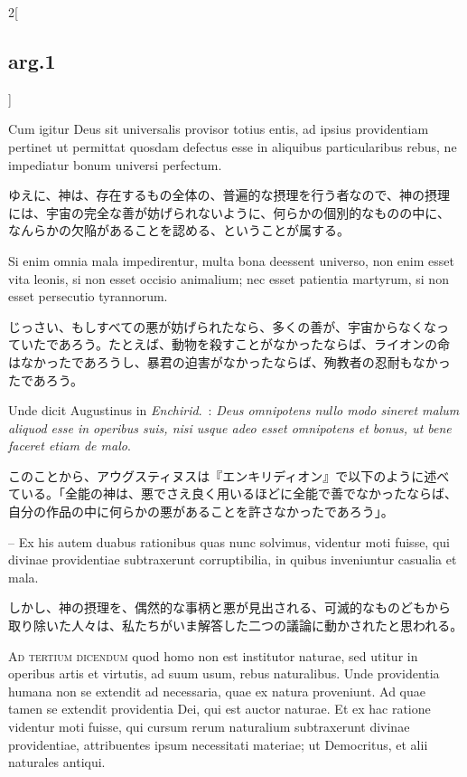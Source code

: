 \documentclass[paper=a4paper,fontsize=10pt,jafontsize=9pt,titlepage]{jlreq}
\begin{document}
\begin{paracol}{2}[\subsection{arg.1}]
\switchcolumn*

Cum igitur Deus sit universalis provisor totius entis, ad
ipsius providentiam pertinet ut permittat quosdam defectus esse in
aliquibus particularibus rebus, ne impediatur bonum universi
perfectum.

\switchcolumn

ゆえに、神は、存在するもの全体の、普遍的な摂理を行う者なので、神の摂理
には、宇宙の完全な善が妨げられないように、何らかの個別的なものの中に、
なんらかの欠陥があることを認める、ということが属する。

\switchcolumn*

Si enim omnia mala impedirentur, multa bona deessent
universo, non enim esset vita leonis, si non esset occisio animalium;
nec esset patientia martyrum, si non esset persecutio tyrannorum.

\switchcolumn

じっさい、もしすべての悪が妨げられたなら、多くの善が、宇宙からなくなっ
ていたであろう。たとえば、動物を殺すことがなかったならば、ライオンの命
はなかったであろうし、暴君の迫害がなかったならば、殉教者の忍耐もなかっ
たであろう。

\switchcolumn*

Unde
dicit Augustinus in {\itshape Enchirid}.~: 
{\itshape Deus omnipotens nullo modo sineret malum
aliquod esse in operibus suis, nisi usque adeo esset omnipotens et
bonus, ut bene faceret etiam de malo}.

\switchcolumn

このことから、アウグスティヌスは『エンキリディオン』で以下のように述べ
ている。「全能の神は、悪でさえ良く用いるほどに全能で善でなかったならば、
自分の作品の中に何らかの悪があることを許さなかったであろう」。

\switchcolumn*

-- Ex his autem duabus rationibus
quas nunc solvimus, videntur moti fuisse, qui divinae providentiae
subtraxerunt corruptibilia, in quibus inveniuntur casualia et mala.

\switchcolumn

しかし、神の摂理を、偶然的な事柄と悪が見出される、可滅的なものどもから
取り除いた人々は、私たちがいま解答した二つの議論に動かされたと思われる。

\switchcolumn*[\subsection{ad.3}]

{\scshape Ad tertium dicendum} quod homo non est
institutor naturae, sed utitur in operibus artis et virtutis, ad suum
usum, rebus naturalibus. Unde providentia humana non se extendit ad
necessaria, quae ex natura proveniunt. Ad quae tamen se extendit
providentia Dei, qui est auctor naturae. Et ex hac ratione videntur moti
fuisse, qui cursum rerum naturalium subtraxerunt divinae providentiae,
attribuentes ipsum necessitati materiae; ut Democritus, et alii
naturales antiqui.


\end{paracol}
\end{document}

